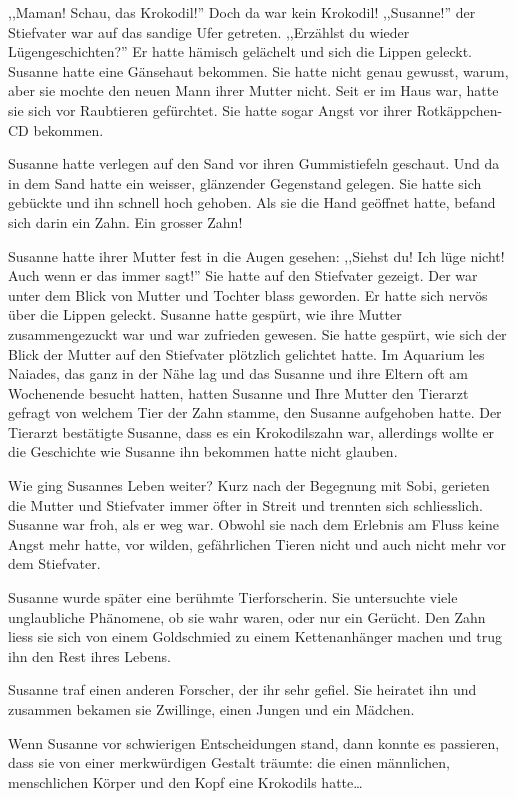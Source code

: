 ,,Maman! Schau, das Krokodil!''
Doch da war kein Krokodil! ,,Susanne!'' der Stiefvater war auf das sandige Ufer getreten. ,,Erzählst du wieder Lügengeschichten?'' Er hatte hämisch gelächelt und sich die Lippen geleckt. Susanne hatte eine Gänsehaut bekommen. Sie hatte nicht genau gewusst, warum, aber  sie mochte den neuen Mann ihrer Mutter nicht. Seit er im Haus war, hatte sie sich vor Raubtieren gefürchtet. Sie hatte sogar Angst vor ihrer Rotkäppchen-CD bekommen. 

Susanne hatte verlegen auf den Sand vor ihren Gummistiefeln geschaut. Und da in dem Sand hatte ein weisser, glänzender Gegenstand gelegen. Sie hatte sich gebückte und ihn schnell hoch gehoben. Als sie die Hand geöffnet hatte, befand sich darin ein Zahn. Ein grosser Zahn!

Susanne hatte ihrer Mutter fest in die Augen gesehen: ,,Siehst du! Ich lüge nicht! Auch wenn er das immer sagt!'' Sie hatte auf den Stiefvater gezeigt. Der war unter dem Blick von Mutter und Tochter blass geworden. Er hatte sich nervös über die Lippen geleckt. Susanne hatte gespürt, wie ihre Mutter zusammengezuckt war und war zufrieden gewesen. Sie hatte gespürt, wie sich der Blick der Mutter auf den Stiefvater plötzlich gelichtet hatte.
Im Aquarium les Naiades, das ganz in der Nähe lag und das Susanne und ihre Eltern oft am Wochenende besucht hatten, hatten Susanne und Ihre Mutter den Tierarzt gefragt von welchem Tier der Zahn stamme, den Susanne aufgehoben hatte. Der Tierarzt bestätigte Susanne, dass es ein Krokodilszahn war, allerdings wollte er die Geschichte wie Susanne ihn bekommen hatte nicht glauben. 

\sterne

Wie ging Susannes Leben weiter? Kurz nach der Begegnung mit Sobi, gerieten die Mutter und Stiefvater immer öfter in Streit und trennten sich schliesslich. Susanne war froh, als er weg war. Obwohl sie nach dem Erlebnis am Fluss keine Angst mehr hatte, vor wilden, gefährlichen Tieren nicht und auch nicht mehr vor dem Stiefvater.

Susanne wurde später eine berühmte Tierforscherin. Sie untersuchte viele unglaubliche Phänomene, ob sie wahr waren, oder nur ein Gerücht. Den Zahn liess sie sich von einem Goldschmied zu einem Kettenanhänger machen und trug ihn den Rest ihres Lebens.

Susanne traf einen anderen Forscher, der ihr sehr gefiel. Sie heiratet ihn und zusammen bekamen sie Zwillinge, einen Jungen und ein Mädchen.

Wenn Susanne vor schwierigen Entscheidungen stand, dann konnte es passieren, dass sie von einer merkwürdigen Gestalt träumte: die einen männlichen, menschlichen Körper und den Kopf eine Krokodils hatte\dots



